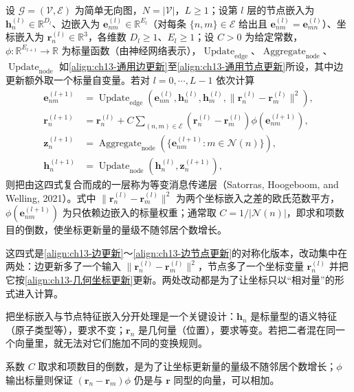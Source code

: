 \documentclass[../../main.tex]{subfiles}
\begin{document}
\begin{definition}[等变消息传递]\label{definition:ch13-等变消息传递}
设 $\mathcal{G}=(\mathcal{V},\mathcal{E})$ 为简单无向图，$N=|\mathcal{V}|$，$L\geqslant1$；设第 $l$ 层的节点嵌入为 $\bm{h}_n^{(l)}\in\mathbb{R}^{D_l}$、边嵌入为 $\bm{e}_{nm}^{(l)}\in\mathbb{R}^{E_l}$（对每条 $\{n,m\}\in\mathcal{E}$ 给出且 $\bm{e}_{nm}^{(l)}=\bm{e}_{mn}^{(l)}$）、坐标嵌入为 $\bm{r}_n^{(l)}\in\mathbb{R}^{3}$，各维数 $D_l\geqslant1$、$E_l\geqslant1$；设 $C>0$ 为给定常数，$\phi:\mathbb{R}^{E_{l+1}}\to\mathbb{R}$ 为标量函数（由神经网络表示），$\operatorname{Update}_{\mathrm{edge}}$、$\operatorname{Aggregate}_{\mathrm{node}}$、$\operatorname{Update}_{\mathrm{node}}$ 如\eqref{align:ch13-通用边更新}至\eqref{align:ch13-通用节点更新}所设，其中边更新额外取一个标量自变量。若对 $l=0,\cdots,L-1$ 依次计算
\begin{align}
\bm{e}_{nm}^{(l+1)}&=\operatorname{Update}_{\mathrm{edge}}\!\left(\bm{e}_{nm}^{(l)},\bm{h}_n^{(l)},\bm{h}_m^{(l)},\|\bm{r}_n^{(l)}-\bm{r}_m^{(l)}\|^2\right),
\label{align:ch13-几何边更新}\\
\bm{r}_n^{(l+1)}&=\bm{r}_n^{(l)}+C\sum_{(n,m)\in\mathcal{E}}\!\left(\bm{r}_n^{(l)}-\bm{r}_m^{(l)}\right)\phi\!\left(\bm{e}_{nm}^{(l+1)}\right),
\label{align:ch13-几何坐标更新}\\
\bm{z}_n^{(l+1)}&=\operatorname{Aggregate}_{\mathrm{node}}\!\left(\{\bm{e}_{nm}^{(l+1)}:m\in\mathcal{N}(n)\}\right),
\label{align:ch13-几何聚合}\\
\bm{h}_n^{(l+1)}&=\operatorname{Update}_{\mathrm{node}}\!\left(\bm{h}_n^{(l)},\bm{z}_n^{(l+1)}\right),
\label{align:ch13-几何节点更新}
\end{align}
则把由这四式复合而成的一层称为等变消息传递层（Satorras, Hoogeboom, and Welling, 2021）。式中 $\|\bm{r}_n^{(l)}-\bm{r}_m^{(l)}\|^{2}$ 为两个坐标嵌入之差的欧氏范数平方，$\phi(\bm{e}_{nm}^{(l+1)})$ 为只依赖边嵌入的标量权重；通常取 $C=1/|\mathcal{N}(n)|$，即求和项数目的倒数，使坐标更新量的量级不随邻居个数增长。
\end{definition}

\begin{remark}
这四式是\eqref{align:ch13-边更新}～\eqref{align:ch13-边节点更新}的对称化版本，改动集中在两处：边更新多了一个输入 $\|\bm{r}_n^{(l)}-\bm{r}_m^{(l)}\|^2$，节点多了一个坐标变量 $\bm{r}_n^{(l)}$ 并把它按\eqref{align:ch13-几何坐标更新}更新。两处改动都是为了让坐标只以“相对量”的形式进入计算。\par
把坐标嵌入与节点特征嵌入分开处理是一个关键设计：$\bm{h}_n$ 是标量型的语义特征（原子类型等），要求不变；$\bm{r}_n$ 是几何量（位置），要求等变。若把二者混在同一个向量里，就无法对它们施加不同的变换规则。\par
系数 $C$ 取求和项数目的倒数，是为了让坐标更新量的量级不随邻居个数增长；$\phi$ 输出标量则保证 $(\bm{r}_n-\bm{r}_m)\phi$ 仍是与 $\bm{r}$ 同型的向量，可以相加。
\end{remark}
\end{document}
